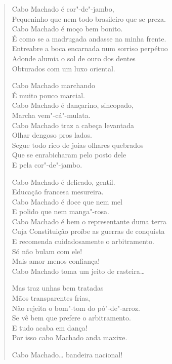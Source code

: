 \begin{verse}
Cabo Machado é cor"-de"-jambo,\\
Pequeninho que nem todo brasileiro que se preza.\\
Cabo Machado é moço bem bonito.\\
É como se a madrugada andasse na minha frente.\\
Entreabre a boca encarnada num sorriso perpétuo\\
Adonde alumia o sol de ouro dos dentes\\
Obturados com um luxo oriental.

Cabo Machado marchando\\
É muito pouco marcial.\\
Cabo Machado é dançarino, sincopado,\\
Marcha vem"-cá"-mulata.\\
Cabo Machado traz a cabeça levantada\\
Olhar dengoso pros lados.\\
Segue todo rico de joias olhares quebrados\\
Que se enrabicharam pelo posto dele\\
E pela cor"-de"-jambo.

Cabo Machado é delicado, gentil.\\
Educação francesa mesureira.\\
Cabo Machado é doce que nem mel\\
E polido que nem manga"-rosa.\\
Cabo Machado é bem o representante duma terra\\
Cuja Constituição proíbe as guerras de conquista\\
E recomenda cuidadosamente o arbitramento.\\
Só não bulam com ele!\\
Mais amor menos confiança!\\
Cabo Machado toma um jeito de rasteira\ldots{}

Mas traz unhas bem tratadas\\
Mãos transparentes frias,\\
Não rejeita o bom"-tom do pó"-de"-arroz.\\
Se vê bem que prefere o arbitramento.\\
E tudo acaba em dança!\\
Por isso cabo Machado anda maxixe.

Cabo Machado\ldots{} bandeira nacional!
\end{verse}


